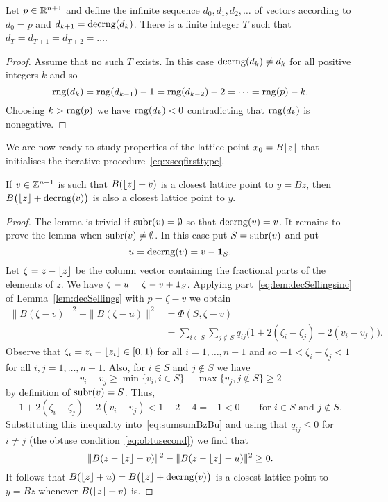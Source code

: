 \documentclass[final,leqno]{siamltex}
\begin{document}
\begin{proposition} \label{lem:repeatappdecrange} Let $p \in {\mathbb R}^{n+1}$ and define the infinite sequence $d_0,d_1,d_2,\dots$ of vectors according to $d_0=p$ and $d_{k+1} = \operatorname{decrng}(d_k)$.  There is a finite integer $T$ such that $d_T=d_{T+1}=d_{T+2}=\dots$.
\end{proposition}
\begin{proof}
Assume that no such $T$ exists.  In this case $\operatorname{decrng}(d_k) \neq d_k$ for all positive integers $k$ and so 
\[
\operatorname{rng}(d_{k}) = \operatorname{rng}(d_{k-1}) - 1 = \operatorname{rng}(d_{k-2}) - 2 = \dots = \operatorname{rng}(p) - k.
\]  
Choosing $k > \operatorname{rng}(p)$ we have $\operatorname{rng}(d_{k}) < 0$ contradicting that $\operatorname{rng}(d_k)$ is nonegative.
\end{proof}

We are now ready to study properties of the lattice point $x_0 = B{\left\lfloor z \right\rfloor}$ that initialises the iterative procedure~\eqref{eq:xseqfirsttype}.

\begin{lemma}\label{lem:decrngpreservesclosestpoints}
If $v \in {\mathbb Z}^{n+1}$ is such that $B({\left\lfloor z \right\rfloor} + v)$ is a closest lattice point to $y = Bz$, then $B\big({\left\lfloor z \right\rfloor} + \operatorname{decrng}(v)\big)$ is also a closest lattice point to $y$.
\end{lemma}
\begin{proof}
The lemma is trivial if $\operatorname{subr}(v) = \emptyset$ so that $\operatorname{decrng}(v) = v$.  It remains to prove the lemma when $\operatorname{subr}(v) \neq \emptyset$.  In this case put $S = \operatorname{subr}(v)$ and put 
\[
u = \operatorname{decrng}(v) = v - \boldsymbol{1}_S.
\] 
Let $\zeta = z - {\left\lfloor z \right\rfloor}$ be the column vector containing the fractional parts of the elements of $z$.  We have $\zeta - u = \zeta - v + \boldsymbol{1}_S$.  Applying part~\ref{eq:lem:decSellingsinc} of Lemma~\ref{lem:decSellings} with $p = \zeta - v$ we obtain
\begin{align}
\|B(\zeta - v)\|^2 - \|B(\zeta - u)\|^2 &= \Phi(S, \zeta-v) \nonumber \\
&= \sum_{i \in S}\sum_{j \notin S}q_{ij}\big(1 + 2(\zeta_i-\zeta_j) - 2(v_i - v_j)\big). \label{eq:sumsumBzBu}
\end{align}
Observe that $\zeta_i =  z_i - {\left\lfloor z_i \right\rfloor} \in [0,1)$ for all $i=1,\dots,n+1$ and so $-1 < \zeta_i-\zeta_j < 1$ for all $i,j=1,\dots,n+1$.  Also, for $i \in S$ and $j\notin S$ we have 
\[
v_i - v_j \geq \min\{ v_i, i \in S\} - \max\{v_j, j \notin S\} \geq 2
\]
by definition of $\operatorname{subr}(v) = S$.  Thus,
\[
1 + 2(\zeta_i-\zeta_j) - 2(v_i - v_j) < 1 + 2 - 4 = -1 < 0 \qquad \text{for $i \in S$ and $j \notin S$}.
\]
Substituting this inequality into~\eqref{eq:sumsumBzBu} and using that $q_{ij} \leq 0$ for $i \neq j$ (the obtuse condition~\eqref{eq:obtusecond}) we find that
\[
\|B(z - {\left\lfloor z \right\rfloor} - v)\|^2 - \|B(z - {\left\lfloor z \right\rfloor} - u)\|^2 \geq 0.
\]
It follows that $B({\left\lfloor z \right\rfloor} + u) = B\big({\left\lfloor z \right\rfloor} + \operatorname{decrng}(v)\big)$ is a closest lattice point to $y = Bz$ whenever $B({\left\lfloor z \right\rfloor} + v)$ is.
\end{proof}
\end{document}
